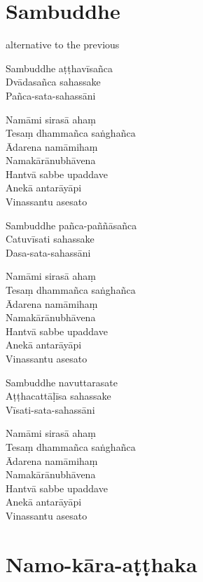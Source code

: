 \chapter{Sambuddhe}%


\begin{paritta}
\begin{instruction}
alternative to the previous
\end{instruction}

Sambuddhe aṭṭhavīsañca\\
Dvādasañca sahassake\\
Pañca-sata-sahassāni

Namāmi sirasā ahaṃ\\
Tesaṃ dhammañca saṅghañca\\
Ādarena namāmihaṃ\\
Namakārānubhāvena\\
Hantvā sabbe upaddave\\
Anekā antarāyāpi\\
Vinassantu asesato

\clearpage

Sambuddhe pañca-paññāsañca\\
Catuvīsati sahassake\\
Dasa-sata-sahassāni

Namāmi sirasā ahaṃ\\
Tesaṃ dhammañca saṅghañca\\
Ādarena namāmihaṃ\\
Namakārānubhāvena\\
Hantvā sabbe upaddave\\
Anekā antarāyāpi\\
Vinassantu asesato

Sambuddhe navuttarasate\\
Aṭṭhacattāḷīsa sahassake\\
Vīsati-sata-sahassāni

Namāmi sirasā ahaṃ\\
Tesaṃ dhammañca saṅghañca\\
Ādarena namāmihaṃ\\
Namakārānubhāvena\\
Hantvā sabbe upaddave\\
Anekā antarāyāpi\\
Vinassantu asesato
\end{paritta}

\clearpage

\chapter{Namo-kāra-aṭṭhaka}%

